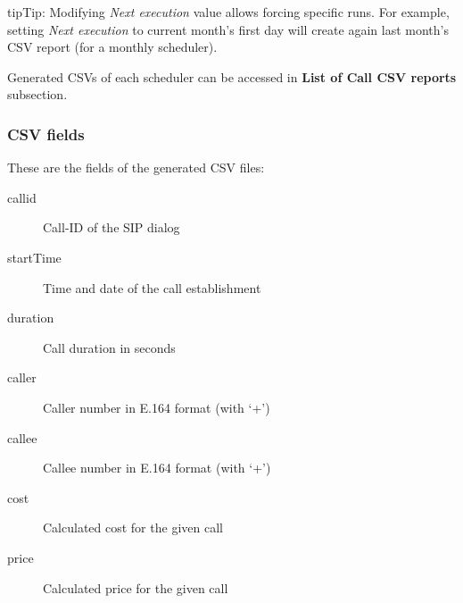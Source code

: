 \documentclass[letterpaper,10pt,english]{sphinxmanual}
\begin{document}
\begin{notice}{tip}{Tip:}
Modifying \emph{Next execution} value allows forcing specific runs. For example, setting \emph{Next execution} to
current month's first day will create again last month's CSV report (for a monthly scheduler).
\end{notice}

Generated CSVs of each scheduler can be accessed in \textbf{List of Call CSV reports} subsection.


\subsubsection{CSV fields}
\label{administration_portal/brand/calls/call_csv_schedulers:csv-fields}
These are the fields of the generated CSV files:
\begin{description}
\item[{callid}] \leavevmode{}\label{administration_portal/brand/calls/call_csv_schedulers:term-callid}
Call-ID of the SIP dialog

\item[{startTime}] \leavevmode{}\label{administration_portal/brand/calls/call_csv_schedulers:term-starttime}
Time and date of the call establishment

\item[{duration}] \leavevmode{}\label{administration_portal/brand/calls/call_csv_schedulers:term-duration}
Call duration in seconds

\item[{caller}] \leavevmode{}\label{administration_portal/brand/calls/call_csv_schedulers:term-caller}
Caller number in E.164 format (with `+')

\item[{callee}] \leavevmode{}\label{administration_portal/brand/calls/call_csv_schedulers:term-callee}
Callee number in E.164 format (with `+')

\item[{cost}] \leavevmode{}\label{administration_portal/brand/calls/call_csv_schedulers:term-cost}
Calculated cost for the given call

\item[{price}] \leavevmode{}\label{administration_portal/brand/calls/call_csv_schedulers:term-price}
Calculated price for the given call


\end{description}
\end{document}
